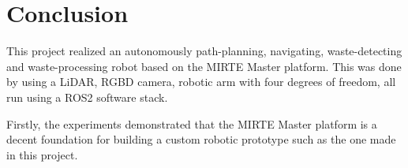\section{Conclusion}

This project realized an autonomously path-planning, navigating, waste-detecting and waste-processing robot based on the MIRTE Master platform. This was done by using a LiDAR, RGBD camera, robotic arm with four degrees of freedom, all run using a ROS2 software stack.

Firstly, the experiments demonstrated that the MIRTE Master platform is a decent foundation for building a custom robotic prototype such as the one made in this project.